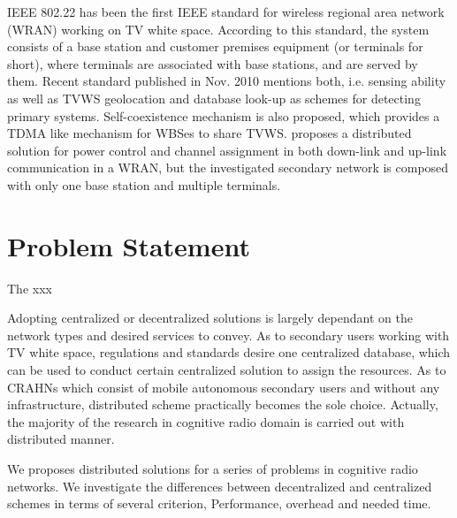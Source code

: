 IEEE 802.22 has been the first IEEE standard for wireless regional area network (WRAN) working on TV white space. According to this standard, the system consists of a base station and customer premises equipment (or terminals for short), where terminals are associated with base stations, and are served by them. Recent standard published in Nov. 2010 mentions both, i.e. sensing ability as well as TVWS geolocation and database look-up as schemes for detecting primary systems. Self-coexistence mechanism is also proposed, which provides a TDMA like mechanism for WBSes to share TVWS. \cite{HoangPowerChannel2010} proposes a distributed solution for power control and channel assignment in both down-link and up-link communication in a WRAN, but the investigated secondary network is composed with only one base station and multiple terminals. %










\section{Problem Statement}
The xxx

Adopting centralized or decentralized solutions is largely dependant on the network types and desired services to convey.
As to secondary users working with TV white space, regulations and standards desire one centralized database, which can be used to conduct certain centralized solution to assign the resources.
As to CRAHNs which consist of mobile autonomous secondary users and without any infrastructure, distributed scheme practically becomes the sole choice.
Actually, the majority of the research in cognitive radio domain is carried out with distributed manner.

We proposes distributed solutions for a series of problems in cognitive radio networks.
We investigate the differences between decentralized and centralized schemes in terms of several criterion, \ie Performance, overhead and needed time.



